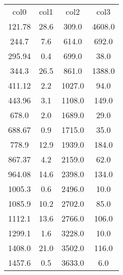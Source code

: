 \begin{table}
\begin{tabular}{cccc}
col0 & col1 & col2 & col3 \\
121.78 & 28.6 & 309.0 & 4608.0 \\
244.7 & 7.6 & 614.0 & 692.0 \\
295.94 & 0.4 & 699.0 & 38.0 \\
344.3 & 26.5 & 861.0 & 1388.0 \\
411.12 & 2.2 & 1027.0 & 94.0 \\
443.96 & 3.1 & 1108.0 & 149.0 \\
678.0 & 2.0 & 1689.0 & 29.0 \\
688.67 & 0.9 & 1715.0 & 35.0 \\
778.9 & 12.9 & 1939.0 & 184.0 \\
867.37 & 4.2 & 2159.0 & 62.0 \\
964.08 & 14.6 & 2398.0 & 134.0 \\
1005.3 & 0.6 & 2496.0 & 10.0 \\
1085.9 & 10.2 & 2702.0 & 85.0 \\
1112.1 & 13.6 & 2766.0 & 106.0 \\
1299.1 & 1.6 & 3228.0 & 10.0 \\
1408.0 & 21.0 & 3502.0 & 116.0 \\
1457.6 & 0.5 & 3633.0 & 6.0 \\
\end{tabular}
\end{table}
